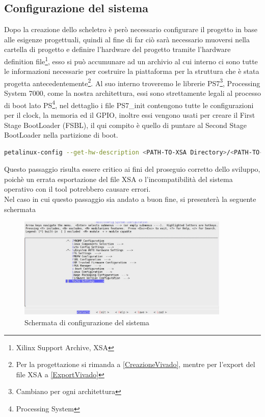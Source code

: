 \subsection{Configurazione del sistema}
Dopo la creazione dello scheletro è però necessario configurare il progetto in base alle esigenze progettuali, quindi al fine di far ciò sarà necessario muoversi nella cartella di progetto e definire l'hardware del progetto tramite l'hardware definition file\footnote{Xilinx Support Archive, XSA},  esso si può accumunare ad un archivio al cui interno ci sono tutte le informazioni necessarie per costruire la piattaforma per la struttura che è stata progetta antecedentemente\footnote{Per la progettazione si rimanda a \ref{CreazioneVivado}, mentre per l'export del file XSA a \ref{ExportVivado}}. Al suo interno troveremo le librerie PS7\footnote{Cambiano per ogni architettura}, Processing System 7000, come la nostra architettura, essi sono strettamente legali al processo di boot lato PS\footnote{Processing System}, nel dettaglio i file PS7\_init contengono tutte le configurazioni per il clock, la memoria ed il GPIO, inoltre essi vengono usati per creare il First Stage BootLoader (FSBL), il qui compito è quello di puntare al Second Stage BootLoader nella partizione di boot. 
\begin{lstlisting}[language=sh, label=lst:sh, caption={Comando necessario alla definizione dell'hardware}]
petalinux-config --get-hw-description <PATH-TO-XSA Directory>/<PATH-TO-XSA>
\end{lstlisting}
Questo passaggio risulta essere critico ai fini del proseguio corretto dello sviluppo, poichè un errata esportazione del file XSA o l'incompatibilità del sistema operativo con il tool potrebbero causare errori.\\
Nel caso in cui questo passaggio sia andato a buon fine, si presenterà la seguente schermata
\begin{figure}[h]
\centering
\includegraphics[width=0.9\textwidth]{images/image1.jpg}
\caption{Schermata di configurazione del sistema}
\end{figure}
